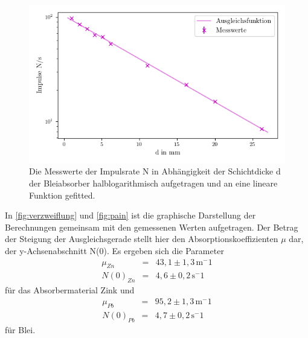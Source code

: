 \begin{figure}[H]
  \centering
  \includegraphics{content/pain.png}
  \caption{Die Messwerte der Impulsrate N in Abhängigkeit der 
  Schichtdicke d der Bleiabsorber halblogarithmisch aufgetragen und an eine lineare Funktion gefitted.}
  \label{fig:pain}
\end{figure}
In \autoref{fig:verzweiflung} und  \autoref{fig:pain} ist die graphische Darstellung der Berechnungen gemeinsam mit den 
gemessenen Werten aufgetragen. Der Betrag der Steigung der Ausgleichsgerade stellt hier den Absorptionskoeffizienten $\mu$ dar,
der y-Achsenabschnitt N(0). Es ergeben sich die Parameter 
\begin{eqnarray}
  \mu_{Zn} &=&  43,1 \pm 1,3\,  \mathrm{m^-1} \nonumber \\
  N(0)_{Zn} &=& 4,6 \pm 0,2 \, \mathrm{s^-1} \nonumber
\end{eqnarray}
für das Absorbermaterial Zink und 
\begin{eqnarray}
  \mu_{Pb} &=&  95,2 \pm 1,3 \,  \mathrm{m^-1} \nonumber \\
  N(0)_{Pb} &=& 4,7 \pm 0,2 \, \mathrm{s^-1} \nonumber
\end{eqnarray}
für Blei. \\



%


